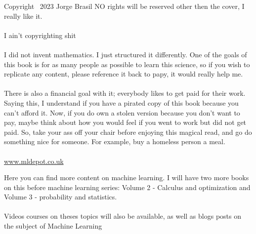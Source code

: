 \documentclass[a4,12pt,twosided,openany]{memoir}
\begin{document}


\newpage
\clearpage

\vspace*{\fill}

Copyright \textcopyright\ 2023 Jorge Brasil NO rights will be reserved other then the cover, I really like it.
\paragraph{}
I ain't copyrighting shit
\paragraph{}
I did not invent mathematics. I just structured it differently. One of the goals of this book is for as many people as possible to learn this science, so if you wish to replicate any content, please reference it back to papy, it would really help me. 
\paragraph{}
There is also a financial goal with it; everybody likes to get paid for their work. Saying this, I understand if you have a pirated copy of this book because you can't afford it. Now, if you do own a stolen version because you don’t want to pay, maybe think about how you would feel if you went to work but did not get paid. So, take your ass off your chair before enjoying this magical read, and go do something nice for someone. For example, buy a homeless person a
meal.

\paragraph{}
\href{www.mldepot.co.uk}{www.mldepot.co.uk} 
\par 
\indent
Here you can find more content on machine learning. I will have two more books on this before  machine learning series: Volume 2 - Calculus and optimization and Volume 3 - probability and statistics.
\paragraph{}
Videos courses on theses topics will also be available, as well as blogs posts on the subject of Machine Learning 

\clearpage



\tableofcontents
\listoffigures
\end{document}
